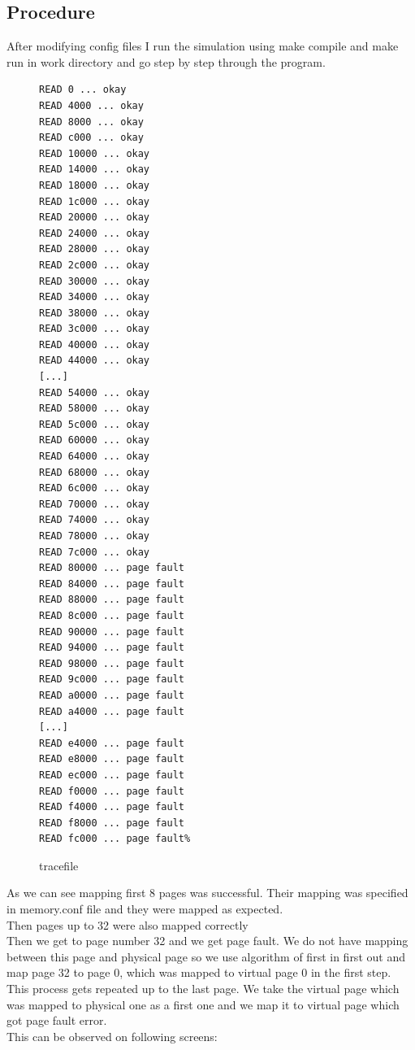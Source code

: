 \documentclass{article}
\begin{document}
\subsection{Procedure}
After modifying config files I run the simulation using make compile and make
run in work directory and go step by step through the program. 
\begin{figure}[H]
	\caption{tracefile}
\begin{lstlisting}
READ 0 ... okay
READ 4000 ... okay
READ 8000 ... okay
READ c000 ... okay
READ 10000 ... okay
READ 14000 ... okay
READ 18000 ... okay
READ 1c000 ... okay
READ 20000 ... okay
READ 24000 ... okay
READ 28000 ... okay
READ 2c000 ... okay
READ 30000 ... okay
READ 34000 ... okay
READ 38000 ... okay
READ 3c000 ... okay
READ 40000 ... okay
READ 44000 ... okay
[...]
READ 54000 ... okay
READ 58000 ... okay
READ 5c000 ... okay
READ 60000 ... okay
READ 64000 ... okay
READ 68000 ... okay
READ 6c000 ... okay
READ 70000 ... okay
READ 74000 ... okay
READ 78000 ... okay
READ 7c000 ... okay
READ 80000 ... page fault
READ 84000 ... page fault
READ 88000 ... page fault
READ 8c000 ... page fault
READ 90000 ... page fault
READ 94000 ... page fault
READ 98000 ... page fault
READ 9c000 ... page fault
READ a0000 ... page fault
READ a4000 ... page fault
[...]
READ e4000 ... page fault
READ e8000 ... page fault
READ ec000 ... page fault
READ f0000 ... page fault
READ f4000 ... page fault
READ f8000 ... page fault
READ fc000 ... page fault%
\end{lstlisting}
\end{figure}
As we can see mapping first 8 pages was successful. Their mapping was specified
in memory.conf file and they were mapped as expected. \\
Then pages up to 32 were also mapped correctly \\
Then we get to page number 32 and we get page fault. We do not have mapping
between this page and physical page so we use algorithm of first in first out
and map page 32 to page 0, which was mapped to virtual page 0 in the first step.
\\
This process gets repeated up to the last page. We take the virtual page which
was mapped to physical one as a first one and we map it to virtual page which
got page fault error. \\
This can be observed on following screens:
\end{document}
